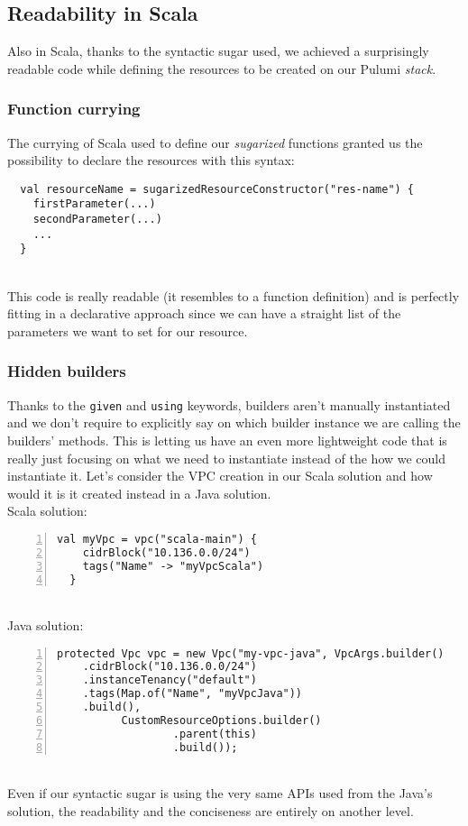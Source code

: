 \subsection{Readability in Scala}
Also in Scala, thanks to the syntactic sugar used, we achieved a surprisingly readable code while defining the resources to be created on our Pulumi \textit{stack}.

\subsubsection{Function currying}
The currying of Scala used to define our \textit{sugarized} functions granted us the possibility to declare the resources with this syntax:
\begin{verbatim}
  val resourceName = sugarizedResourceConstructor("res-name") {
    firstParameter(...)
    secondParameter(...)
    ...
  }
\end{verbatim}\mbox{}\\
This code is really readable (it resembles to a function definition) and is perfectly fitting in a declarative approach since we can have a straight list of the parameters we want to set for our resource.\\

\subsubsection{Hidden builders}
Thanks to the \texttt{given} and \texttt{using} keywords, builders aren't manually instantiated and we don't require to explicitly say on which builder instance we are calling the builders' methods.
This is letting us have an even more lightweight code that is really just focusing on what we need to instantiate instead of the how we could instantiate it.
Let's consider the VPC creation in our Scala solution and how would it is it created instead in a Java solution.\\
Scala solution:
\begin{lstlisting}[numbers=left, numberstyle=\tiny, numbersep=-5pt, stepnumber=1]
  val myVpc = vpc("scala-main") {
    cidrBlock("10.136.0.0/24")
    tags("Name" -> "myVpcScala")
  }
\end{lstlisting}\mbox{}\\
Java solution:
\begin{lstlisting}[numbers=left, numberstyle=\tiny, numbersep=-5pt, stepnumber=1]
  protected Vpc vpc = new Vpc("my-vpc-java", VpcArgs.builder()
    .cidrBlock("10.136.0.0/24")
    .instanceTenancy("default")
    .tags(Map.of("Name", "myVpcJava"))
    .build(),
          CustomResourceOptions.builder()
                  .parent(this)
                  .build());
\end{lstlisting}\mbox{}\\
Even if our syntactic sugar is using the very same APIs used from the Java's solution, the readability and the conciseness are entirely on another level.

